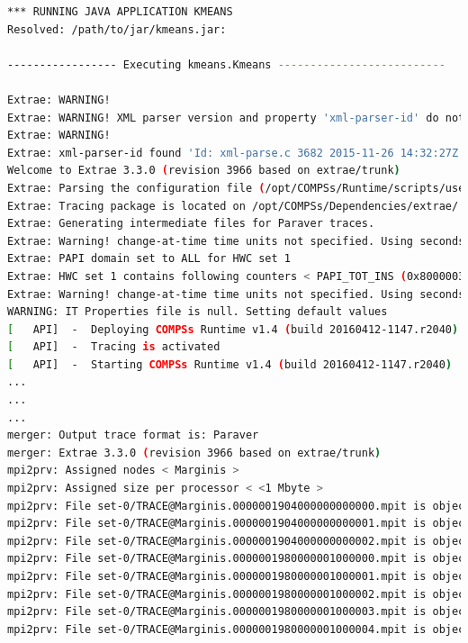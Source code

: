 \begin{lstlisting}[language=bash]
*** RUNNING JAVA APPLICATION KMEANS
Resolved: /path/to/jar/kmeans.jar:

----------------- Executing kmeans.Kmeans --------------------------

Extrae: WARNING!
Extrae: WARNING! XML parser version and property 'xml-parser-id' do not match. Check the XML file. Trying to proceed...
Extrae: WARNING!
Extrae: xml-parser-id found 'Id: xml-parse.c 3682 2015-11-26 14:32:27Z harald $' when expecting 'Id: xml-parse.c 3918 2016-03-11 14:59:01Z harald $'.
Welcome to Extrae 3.3.0 (revision 3966 based on extrae/trunk)
Extrae: Parsing the configuration file (/opt/COMPSs/Runtime/scripts/user/../../configuration/xml/tracing/extrae_basic.xml) begins
Extrae: Tracing package is located on /opt/COMPSs/Dependencies/extrae/
Extrae: Generating intermediate files for Paraver traces.
Extrae: Warning! change-at-time time units not specified. Using seconds
Extrae: PAPI domain set to ALL for HWC set 1
Extrae: HWC set 1 contains following counters < PAPI_TOT_INS (0x80000032) PAPI_TOT_CYC (0x8000003b) PAPI_L2_DCM (0x80000002) PAPI_L3_TCM (0x80000008) > - never changes
Extrae: Warning! change-at-time time units not specified. Using seconds
WARNING: IT Properties file is null. Setting default values
[   API]  -  Deploying COMPSs Runtime v1.4 (build 20160412-1147.r2040)
[   API]  -  Tracing is activated
[   API]  -  Starting COMPSs Runtime v1.4 (build 20160412-1147.r2040)
...
...
...
merger: Output trace format is: Paraver
merger: Extrae 3.3.0 (revision 3966 based on extrae/trunk)
mpi2prv: Assigned nodes < Marginis >
mpi2prv: Assigned size per processor < <1 Mbyte >
mpi2prv: File set-0/TRACE@Marginis.0000001904000000000000.mpit is object 1.1.1 on node Marginis assigned to processor 0
mpi2prv: File set-0/TRACE@Marginis.0000001904000000000001.mpit is object 1.1.2 on node Marginis assigned to processor 0
mpi2prv: File set-0/TRACE@Marginis.0000001904000000000002.mpit is object 1.1.3 on node Marginis assigned to processor 0
mpi2prv: File set-0/TRACE@Marginis.0000001980000001000000.mpit is object 1.2.1 on node Marginis assigned to processor 0
mpi2prv: File set-0/TRACE@Marginis.0000001980000001000001.mpit is object 1.2.2 on node Marginis assigned to processor 0
mpi2prv: File set-0/TRACE@Marginis.0000001980000001000002.mpit is object 1.2.3 on node Marginis assigned to processor 0
mpi2prv: File set-0/TRACE@Marginis.0000001980000001000003.mpit is object 1.2.4 on node Marginis assigned to processor 0
mpi2prv: File set-0/TRACE@Marginis.0000001980000001000004.mpit is object 1.2.5 on node Marginis assigned to processor 0

\end{lstlisting}
